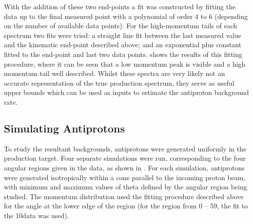 With the addition of these two end-points a fit was constructed by fitting the data up to the final measured point with a polynomial of order 4 to 6 (depending on the number of available data points).
For the high-momentum tails of each spectrum two fits were tried: a straight line fit between the last measured value and the kinematic end-point described above; and an exponential plus constant fitted to the end-point and last two data points.  
 shows the results of this fitting procedure, where it can be seen that a low momentum peak is visible and a high momentum tail well described.
Whilst these spectra are very likely not an accurate representation of the true production spectrum, they serve as useful upper bounds which can be used as inputs to estimate the antiproton background rate.

\subsection{Simulating Antiprotons}
\TabAntiprotonRegions
To study the resultant backgrounds, antiprotons were generated uniformly in the production target.
Four separate simulations were run, corresponding to the four angular regions given in the data, as shown in .
For each simulation, antiprotons were generated isotropically within a cone parallel to the incoming proton beam, with minimum and maximum values of theta defined by the angular region being studied.
The momentum distribution used the fitting procedure described above for the angle at the lower edge of the region (for the region from 0 -- 59\degree, the fit to the 10\degree data was used).

